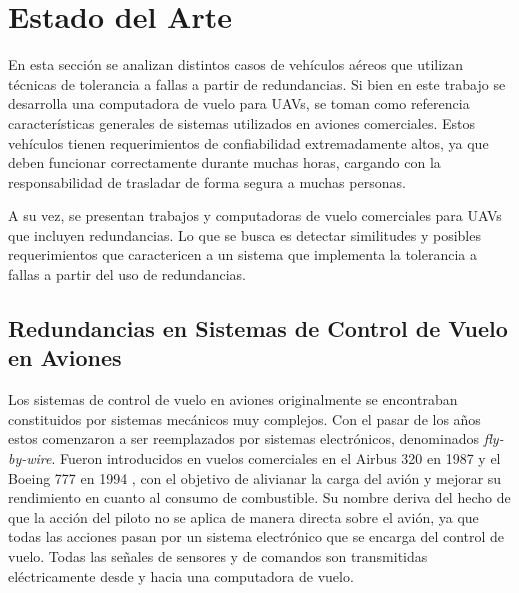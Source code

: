 
\section{Estado del Arte}\label{sec:estado_del_arte}


En esta sección se analizan distintos casos de vehículos aéreos que utilizan técnicas de tolerancia a fallas a partir de redundancias. Si bien en este trabajo se desarrolla una computadora de vuelo para UAVs, se toman como referencia características generales de sistemas utilizados en aviones comerciales. Estos vehículos tienen requerimientos de confiabilidad extremadamente altos, ya que deben funcionar correctamente durante muchas horas, cargando con la responsabilidad de trasladar de forma segura a muchas personas. 

A su vez, se presentan trabajos y computadoras de vuelo comerciales para UAVs que incluyen redundancias. Lo que se busca es detectar similitudes y posibles requerimientos que caractericen a un sistema que implementa la tolerancia a fallas a partir del uso de redundancias.

\subsection{Redundancias en Sistemas de Control de Vuelo en Aviones}

Los sistemas de control de vuelo en aviones originalmente se encontraban constituidos por sistemas mecánicos muy complejos. Con el pasar de los años estos comenzaron a ser reemplazados por sistemas electrónicos, denominados \textit{fly-by-wire}. Fueron introducidos en vuelos comerciales en el Airbus 320 en 1987 y el Boeing 777 en 1994 \cite{FBWNASA}, con el objetivo de alivianar la carga del avión y mejorar su rendimiento en cuanto al consumo de combustible. Su nombre deriva del hecho de que la acción del piloto no se aplica de manera directa sobre el avión, ya que todas las acciones pasan por un sistema electrónico que se encarga del control de vuelo. Todas las señales de sensores y de comandos son transmitidas eléctricamente desde y hacia una computadora de vuelo.

